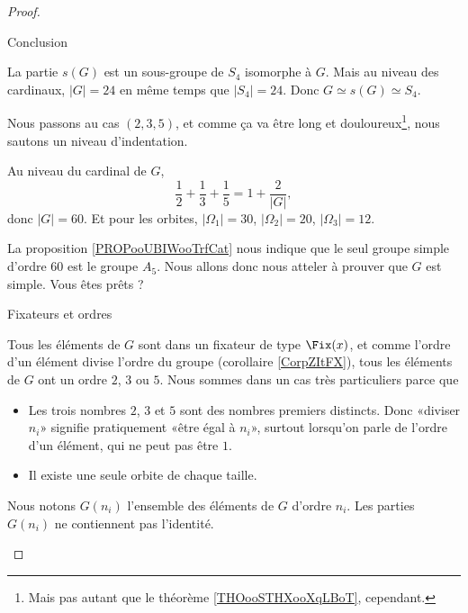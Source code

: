 \begin{proof}
\begin{subproof}
\begin{subproof}
                    \item[Conclusion]

                        La partie \( s(G)\) est un sous-groupe de \( S_4\) isomorphe à \( G\). Mais au niveau des cardinaux, \( | G |=24\) en même temps que \( | S_4 |=24\). Donc \( G\simeq s(G)\simeq S_4\).

                \end{subproof}
                \end{subproof}

        Nous passons au cas \( (2,3,5)\), et comme ça va être long et douloureux\footnote{Mais pas autant que le théorème \ref{THOooSTHXooXqLBoT}, cependant.}, nous sautons un niveau d'indentation.

                Au niveau du cardinal de \( G\), 
                \begin{equation}
                    \frac{1}{ 2 }+\frac{1}{ 3 }+\frac{1}{ 5 }=1+\frac{ 2 }{ | G | },
                \end{equation}
                donc \( | G |=60\). Et pour les orbites, \( | \Omega_1 |=30\), \( | \Omega_2 |=20\), \( | \Omega_3 |=12\).

                La proposition \ref{PROPooUBIWooTrfCat} nous indique que le seul groupe simple d'ordre \( 60\) est le groupe \( A_5\). Nous allons donc nous atteler à prouver que \( G\) est simple. Vous êtes prêts ?


                \begin{subproof}
                    \item[Fixateurs et ordres]

                Tous les éléments de \( G\) sont dans un fixateur de type \( \Fix(x)\), et comme l'ordre d'un élément divise l'ordre du groupe (corollaire \ref{CorpZItFX}), tous les éléments de \( G\) ont un ordre \( 2\), \( 3\) ou \( 5\). Nous sommes dans un cas très particuliers parce que
                \begin{itemize}
                    \item Les trois nombres \( 2\), \( 3\) et \( 5\) sont des nombres premiers distincts. Donc «diviser \( n_i\)» signifie pratiquement «être égal à \( n_i\)», surtout lorsqu'on parle de l'ordre d'un élément, qui ne peut pas être \( 1\).
                    \item Il existe une seule orbite de chaque taille.
                \end{itemize}
            Nous notons \( G(n_i)\) l'ensemble des éléments de \( G\) d'ordre \( n_i\). Les parties \( G(n_i)\) ne contiennent pas l'identité.
                

\end{subproof}
\end{proof}

